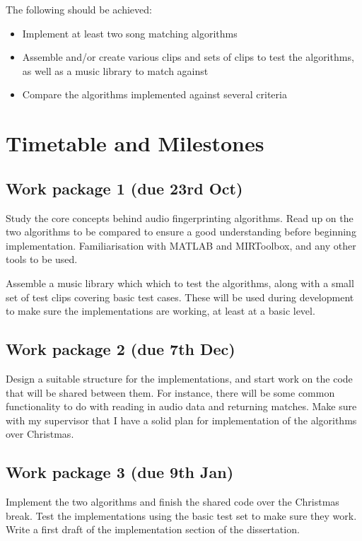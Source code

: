 \documentclass[12pt]{article}
\begin{document}
The following should be achieved:

\begin{itemize}

\item Implement at least two song matching algorithms

\item Assemble and/or create various clips and sets of clips to test the algorithms, as well as a music library to match against

\item Compare the algorithms implemented against several criteria

\end{itemize}


\newpage %

\section*{Timetable and Milestones}

\subsection*{Work package 1 (due 23rd Oct)}
Study the core concepts behind audio fingerprinting algorithms. Read up on the two algorithms to be compared to ensure a good understanding before beginning implementation. Familiarisation with MATLAB and MIRToolbox, and any other tools to be used.

Assemble a music library which which to test the algorithms, along with a small set of test clips covering basic test cases. These will be used during development to make sure the implementations are working, at least at a basic level. 

\subsection*{Work package 2 (due 7th Dec)}
Design a suitable structure for the implementations, and start work on the code that will be shared between them. For instance, there will be some common functionality to do with reading in audio data and returning matches. Make sure with my supervisor that I have a solid plan for implementation of the algorithms over Christmas.

\subsection*{Work package 3 (due 9th Jan)}
Implement the two algorithms and finish the shared code over the Christmas break. Test the implementations using the basic test set to make sure they work. Write a first draft of the implementation section of the dissertation.
\end{document}
